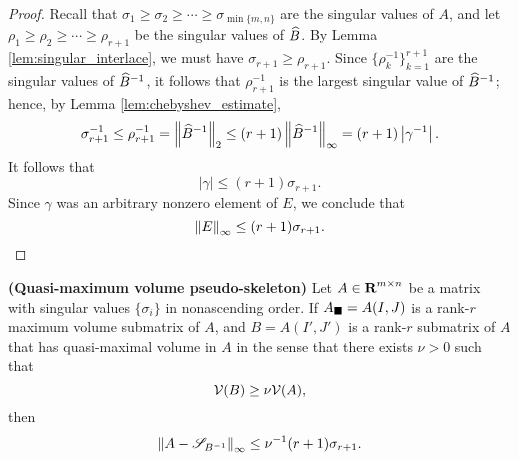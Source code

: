 \documentclass{article}
\begin{document}
\begin{proof}
		Recall that $\sigma_1 \ge \sigma_2 \ge \cdots \ge \sigma_{\min\{m,n\}}$ are the singular values of $A$, and let $\rho_1 \ge \rho_2 \ge \cdots \ge \rho_{r+1}$ be the singular values of $\widehat{B}$. By Lemma \ref{lem:singular_interlace}, we must have $\sigma_{r+1} \ge \rho_{r+1}$. Since $\{\rho_k^{-1}\}_{k=1}^{r+1}$ are the singular values of $\widehat{B}^{-1}$, it follows that $\rho_{r+1}^{-1}$ is the largest singular value of $\widehat{B}^{-1}$; hence, by Lemma \ref{lem:chebyshev_estimate},
		\begin{equation}
			\sigma_{r+1}^{-1} \le \rho_{r+1}^{-1} = \left\lVert \widehat{B}^{-1} \right\rVert_2 \le (r+1)\left\lVert \widehat{B}^{-1} \right\rVert_\infty = (r+1)\left|\gamma^{-1}\right|.
		\end{equation}
		It follows that
		\begin{equation}
			|\gamma| \le (r+1)\sigma_{r+1}.
		\end{equation}
		Since $\gamma$ was an arbitrary nonzero element of $E$, we conclude that
		\begin{equation}
			\left\lVert E \right\rVert_\infty \le (r+1)\sigma_{r+1}.
		\end{equation}
	\end{proof}
	
	\begin{thm} \textnormal{\bf(Quasi-maximum volume pseudo-skeleton)}
		Let $A \in \textnormal{\bf R}^{m\times n}$ be a matrix with singular values $\{\sigma_i\}$ in nonascending order. If $A_\blacksquare = A(I,J)$ is a rank-$r$ maximum volume submatrix of $A$, and $B = A(I', J')$ is a rank-$r$ submatrix of $A$ that has quasi-maximal volume in $A$ in the sense that there exists $\nu > 0$ such that
		\begin{equation}
			\mathcal{V}(B) \ge \nu \mathcal{V}(A),
		\end{equation}
		then
		\begin{equation}
			\left\lVert A - \mathscr{S}_{B^{-1}} \right\rVert_\infty \le \nu^{-1}(r+1)\sigma_{r+1}.
		\end{equation}
	\end{thm}
	
\end{document}
